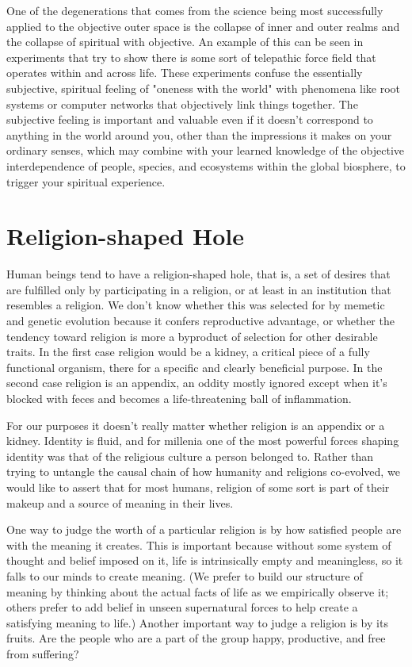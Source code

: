 \documentclass[ebook,12pt,openany,twoside]{memoir}
\begin{document}
One of the degenerations that comes from the science being most successfully
applied to the objective outer space is the collapse of inner and outer realms
and the collapse of spiritual with objective. An example of this can be seen in
experiments that try to show there is some sort of telepathic force field that
operates within and across life. These experiments confuse the essentially
subjective, spiritual feeling of "oneness with the world" with phenomena like
root systems or computer networks that objectively link things together. The
subjective feeling is important and valuable even if it doesn't correspond to
anything in the world around you, other than the impressions it makes on your
ordinary senses, which may combine with your learned knowledge of the objective
interdependence of people, species, and ecosystems within the global biosphere,
to trigger your spiritual experience.

\chapter{Religion-shaped Hole}

Human beings tend to have a religion-shaped hole, that is, a set of desires
that are fulfilled only by participating in a religion, or at least in an
institution that resembles a religion. We don't know whether this was selected
for by memetic and genetic evolution because it confers reproductive advantage,
or whether the tendency toward religion is more a byproduct of selection for
other desirable traits. In the first case religion would be a kidney, a
critical piece of a fully functional organism, there for a specific and clearly
beneficial purpose. In the second case religion is an appendix, an oddity
mostly ignored except when it's blocked with feces and becomes a
life-threatening ball of inflammation.

For our purposes it doesn't really matter whether religion is an appendix or a
kidney. Identity is fluid, and for millenia one of the most powerful forces
shaping identity was that of the religious culture a person belonged to. Rather
than trying to untangle the causal chain of how humanity and religions
co-evolved, we would like to assert that for most humans, religion of some sort
is part of their makeup and a source of meaning in their lives.

One way to judge the worth of a particular religion is by how satisfied people
are with the meaning it creates. This is important because without some system
of thought and belief imposed on it, life is intrinsically empty and
meaningless, so it falls to our minds to create meaning. (We prefer to build
our structure of meaning by thinking about the actual facts of life as we
empirically observe it; others prefer to add belief in unseen supernatural
forces to help create a satisfying meaning to life.) Another important way to
judge a religion is by its fruits. Are the people who are a part of the group
happy, productive, and free from suffering?
\end{document}
